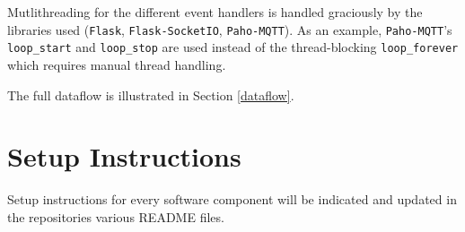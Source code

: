 \documentclass[a4paper,12pt]{article}
\begin{document}
Mutlithreading for the different event handlers is handled graciously by the libraries used (\texttt{Flask}, \texttt{Flask-SocketIO}, \texttt{Paho-MQTT}). As an example, \texttt{Paho-MQTT}'s \texttt{loop\_start} and \texttt{loop\_stop} are used instead of the thread-blocking \texttt{loop\_forever} which requires manual thread handling.

The full dataflow is illustrated in Section \ref{dataflow}.
\section{Setup Instructions}
Setup instructions for every software component will be indicated and updated in the repositories various README files.
\end{document}
